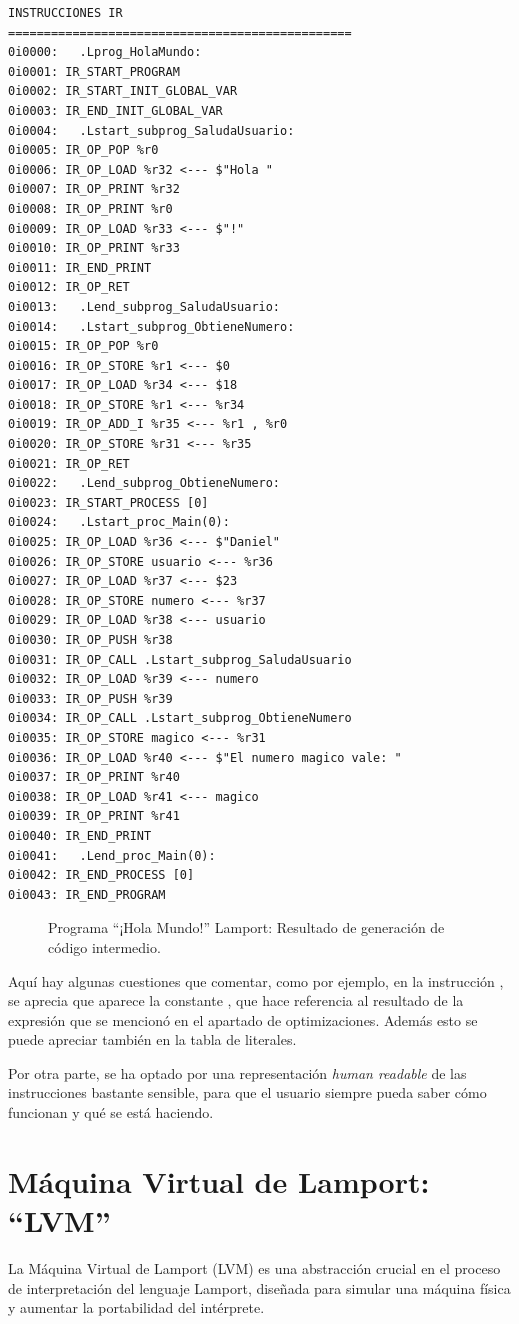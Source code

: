 \begin{verbatim}
INSTRUCCIONES IR
================================================
0i0000:   .Lprog_HolaMundo:
0i0001: IR_START_PROGRAM 
0i0002: IR_START_INIT_GLOBAL_VAR 
0i0003: IR_END_INIT_GLOBAL_VAR 
0i0004:   .Lstart_subprog_SaludaUsuario:
0i0005: IR_OP_POP %r0
0i0006: IR_OP_LOAD %r32 <--- $"Hola "
0i0007: IR_OP_PRINT %r32
0i0008: IR_OP_PRINT %r0
0i0009: IR_OP_LOAD %r33 <--- $"!"
0i0010: IR_OP_PRINT %r33
0i0011: IR_END_PRINT 
0i0012: IR_OP_RET 
0i0013:   .Lend_subprog_SaludaUsuario:
0i0014:   .Lstart_subprog_ObtieneNumero:
0i0015: IR_OP_POP %r0
0i0016: IR_OP_STORE %r1 <--- $0
0i0017: IR_OP_LOAD %r34 <--- $18
0i0018: IR_OP_STORE %r1 <--- %r34
0i0019: IR_OP_ADD_I %r35 <--- %r1 , %r0
0i0020: IR_OP_STORE %r31 <--- %r35
0i0021: IR_OP_RET 
0i0022:   .Lend_subprog_ObtieneNumero:
0i0023: IR_START_PROCESS [0]
0i0024:   .Lstart_proc_Main(0):
0i0025: IR_OP_LOAD %r36 <--- $"Daniel"
0i0026: IR_OP_STORE usuario <--- %r36
0i0027: IR_OP_LOAD %r37 <--- $23
0i0028: IR_OP_STORE numero <--- %r37
0i0029: IR_OP_LOAD %r38 <--- usuario
0i0030: IR_OP_PUSH %r38
0i0031: IR_OP_CALL .Lstart_subprog_SaludaUsuario
0i0032: IR_OP_LOAD %r39 <--- numero
0i0033: IR_OP_PUSH %r39
0i0034: IR_OP_CALL .Lstart_subprog_ObtieneNumero
0i0035: IR_OP_STORE magico <--- %r31
0i0036: IR_OP_LOAD %r40 <--- $"El numero magico vale: "
0i0037: IR_OP_PRINT %r40
0i0038: IR_OP_LOAD %r41 <--- magico
0i0039: IR_OP_PRINT %r41
0i0040: IR_END_PRINT 
0i0041:   .Lend_proc_Main(0):
0i0042: IR_END_PROCESS [0]
0i0043: IR_END_PROGRAM 
\end{verbatim}
\begin{figure}[hbtp]
\caption{Programa ``¡Hola Mundo!'' Lamport: Resultado de generación de código intermedio.}
\label{fig:IRHolaMundo}
\end{figure}

Aquí hay algunas cuestiones que comentar, como por ejemplo, en la instrucción , se aprecia que aparece la constante , que hace referencia al resultado de la expresión que se mencionó en el apartado de optimizaciones. Además esto se puede apreciar también en la tabla de literales. 


Por otra parte, se ha optado por una representación \textit{human readable} de las instrucciones bastante sensible, para que el usuario siempre pueda saber cómo funcionan y qué se está haciendo.

\section{Máquina Virtual de Lamport: ``LVM''}\label{sec:implementacionLVM}
La Máquina Virtual de Lamport (LVM) es una abstracción crucial en el proceso de interpretación del lenguaje Lamport, diseñada para simular una máquina física y aumentar la portabilidad del intérprete.

